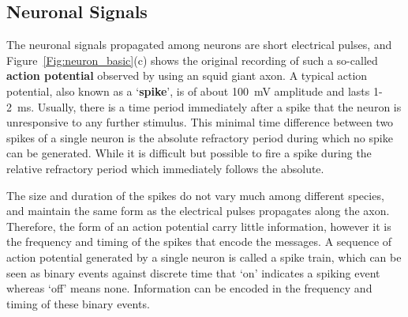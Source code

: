 %


\subsection{Neuronal Signals}
The neuronal signals propagated among neurons are short electrical pulses, and Figure~\ref{Fig:neuron_basic}(c) shows the original recording of such a so-called \textbf{action potential} observed by using an squid giant axon.
A typical action potential, also known as a `\textbf{spike}', is of about 100~mV amplitude and lasts 1-2~ms.
Usually, there is a time period immediately after a spike that the neuron is unresponsive to any further stimulus.
This minimal time difference between two spikes of a single neuron is the absolute refractory period during which no spike can be generated.
While it is difficult but possible to fire a spike during the relative refractory period which immediately follows the absolute.

The size and duration of the spikes do not vary much among different species, and maintain the same form as the electrical pulses propagates along the axon.
Therefore, the form of an action potential carry little information, however it is the frequency and timing of the spikes that encode the messages.
A sequence of action potential generated by a single neuron is called a spike train, which can be seen as binary events against discrete time that `on' indicates a spiking event whereas `off' means none.
Information can be encoded in the frequency and timing of these binary events.


